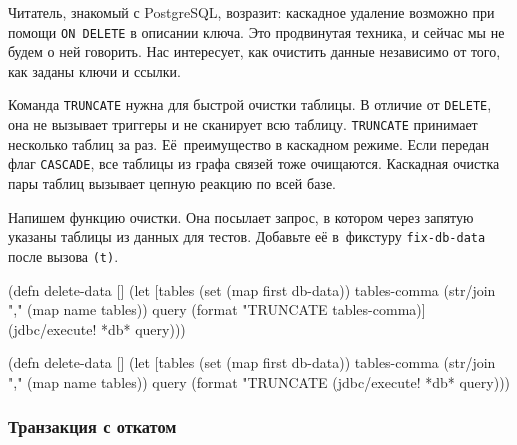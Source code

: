 
Читатель, знакомый с PostgreSQL, возразит: каскадное удаление возможно при
помощи \verb|ON DELETE| в описании ключа. Это продвинутая техника, и сейчас
мы не будем о ней говорить. Нас интересует, как очистить данные независимо от
того, как заданы ключи и ссылки.


Команда \verb|TRUNCATE|  нужна для быстрой очистки таблицы. В
отличие от \verb|DELETE|, она не вызывает триггеры и не сканирует всю
таблицу. \verb|TRUNCATE| принимает несколько таблиц за раз. Её~преимущество в
каскадном режиме. Если передан флаг \verb|CASCADE|, все таблицы из графа связей
тоже очищаются. Каскадная очистка пары таблиц вызывает цепную реакцию по всей
базе.


Напишем функцию очистки. Она посылает запрос, в котором через запятую указаны
таблицы из данных для тестов. Добавьте её в~фикстуру
\verb|fix-db-data|  после вызова \verb|(t)|.

\ifnarrow

\begin{english}
  \begin{clojure}
(defn delete-data []
  (let [tables (set (map first db-data))
        tables-comma
        (str/join "," (map name tables))
        query
        (format "TRUNCATE %
          tables-comma)]
    (jdbc/execute! *db* query)))
  \end{clojure}
\end{english}

\else

\begin{english}
  \begin{clojure}
(defn delete-data []
  (let [tables (set (map first db-data))
        tables-comma (str/join "," (map name tables))
        query (format "TRUNCATE %
    (jdbc/execute! *db* query)))
  \end{clojure}
\end{english}

\fi

\subsubsection*{Транзакция с откатом}




